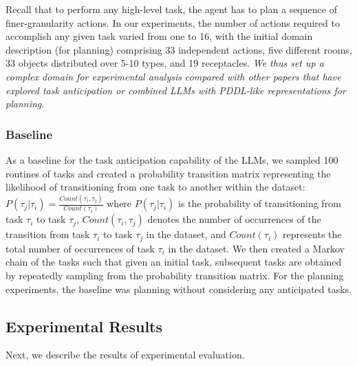 Recall that to perform any high-level task, the agent has to plan a sequence of finer-granularity actions. In our experiments, the number of actions required to accomplish any given task varied from one to 16, with the initial domain description (for planning) comprising 33 independent actions, five different rooms, 33 objects distributed over 5-10 types, and 19 receptacles. \textit{We thus set up a complex domain for experimental analysis compared with other papers that have explored task anticipation or combined LLMs with PDDL-like representations for planning}. 


\vspace{0.5em}
\subsubsection{Baseline}
\label{sec:baseline}
As a baseline for the task anticipation capability of the LLMs, we sampled 100 routines of tasks and created a probability transition matrix representing the likelihood of transitioning from one task to another within the dataset:
\(
P(\tau_{j}|\tau_{i}) = \frac{Count(\tau_{i}, \tau_{j})}{Count(\tau_{i})}
\)
where $P(\tau_{j}|\tau_{i})$ is the probability of transitioning from task $\tau_{i}$ to task $\tau_{j}$, $Count(\tau_{i}, \tau_{j})$ denotes the number of occurrences of the transition from task $\tau_{i}$ to task $\tau_{j}$ in the dataset, and $Count(\tau_{i})$ represents the total number of occurrences of task $\tau_{i}$ in the dataset. We then created a Markov chain of the tasks such that given an initial task, subsequent tasks are obtained by repeatedly sampling from the probability transition matrix. For the planning experiments, the baseline was planning without considering any anticipated tasks.

\subsection{Experimental Results}
\label{sec:expres}
Next, we describe the results of experimental evaluation.

